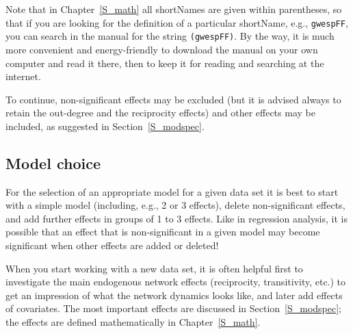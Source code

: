 \documentclass[a4paper,fleqn,11pt]{article}
\newcommand{\+}{\, + \,}
\begin{document}
Note that in Chapter~\ref{S_math} all shortNames are given within
parentheses, so that if you are looking for the definition
of a particular shortName, e.g., \texttt{gwespFF},
you can search in the manual for the string \texttt{(gwespFF)}.
By the way, it is much more convenient and energy-friendly
to download the manual on your own computer and read it there, then
to keep it for reading and searching at the internet.


To continue,  non-significant effects may
be excluded (but it is advised always to retain the out-degree and
the reciprocity effects) and other effects may be included,
as suggested in Section~\ref{S_modspec}.

\subsection{Model choice}
\label{S_model}

For the selection of an appropriate model for a given data set it
is best to start with a simple model (including, e.g., 2 or 3
effects), delete non-significant effects, and add further effects
in groups of 1 to 3 effects. Like in regression analysis, it is
possible that an effect that is non-significant in a given model
may become significant when other effects are added or deleted!

When you start working with a new data set, it is often helpful first
to investigate the main endogenous network effects (reciprocity,
transitivity, etc.) to get an impression of what the network
dynamics looks like, and later add effects of covariates.
The most important effects are discussed in Section~\ref{S_modspec};
the effects are defined mathematically
in Chapter~\ref{S_math}.
\end{document}
